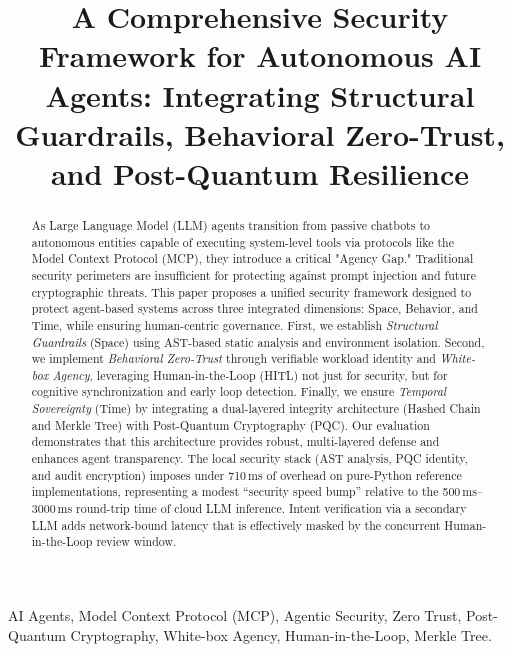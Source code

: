 \documentclass[conference]{IEEEtran}
\begin{document}
\title{A Comprehensive Security Framework for Autonomous AI Agents: Integrating Structural Guardrails, Behavioral Zero-Trust, and Post-Quantum Resilience}

\author{
}

\maketitle

\begin{abstract}
As Large Language Model (LLM) agents transition from passive chatbots to autonomous entities capable of executing system-level tools via protocols like the Model Context Protocol (MCP), they introduce a critical "Agency Gap." Traditional security perimeters are insufficient for protecting against prompt injection and future cryptographic threats. This paper proposes a unified security framework designed to protect agent-based systems across three integrated dimensions: Space, Behavior, and Time, while ensuring human-centric governance. First, we establish \textit{Structural Guardrails} (Space) using AST-based static analysis and environment isolation. Second, we implement \textit{Behavioral Zero-Trust} through verifiable workload identity and \textit{White-box Agency}, leveraging Human-in-the-Loop (HITL) not just for security, but for cognitive synchronization and early loop detection. Finally, we ensure \textit{Temporal Sovereignty} (Time) by integrating a dual-layered integrity architecture (Hashed Chain and Merkle Tree) with Post-Quantum Cryptography (PQC). Our evaluation demonstrates that this architecture provides robust, multi-layered defense and enhances agent transparency. The local security stack (AST analysis, PQC identity, and audit encryption) imposes under 710\,ms of overhead on pure-Python reference implementations, representing a modest ``security speed bump'' relative to the 500\,ms--3000\,ms round-trip time of cloud LLM inference. Intent verification via a secondary LLM adds network-bound latency that is effectively masked by the concurrent Human-in-the-Loop review window.
\end{abstract}

\begin{IEEEkeywords}
AI Agents, Model Context Protocol (MCP), Agentic Security, Zero Trust, Post-Quantum Cryptography, White-box Agency, Human-in-the-Loop, Merkle Tree.
\end{IEEEkeywords}
\end{document}

